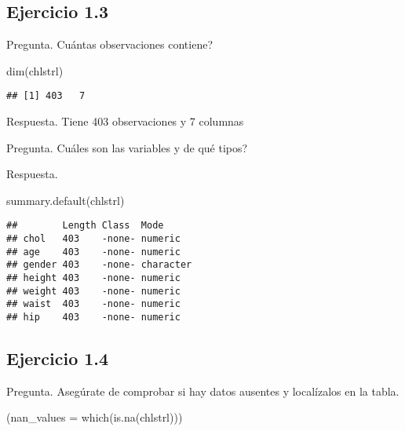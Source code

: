 \documentclass[
]{article}
\newenvironment{Shaded}{\begin{snugshade}}{\end{snugshade}}
\newcommand{\AttributeTok}[1]{\textcolor[rgb]{0.77,0.63,0.00}{#1}}
\newcommand{\FunctionTok}[1]{\textcolor[rgb]{0.00,0.00,0.00}{#1}}
\newcommand{\NormalTok}[1]{#1}
\begin{document}
\hypertarget{ejercicio-1.3}{%
\subsection{Ejercicio 1.3}\label{ejercicio-1.3}}

Pregunta. Cuántas observaciones contiene?

\begin{Shaded}
\begin{Highlighting}[]
\FunctionTok{dim}\NormalTok{(chlstrl)}
\end{Highlighting}
\end{Shaded}

\begin{verbatim}
## [1] 403   7
\end{verbatim}

Respuesta. Tiene 403 observaciones y 7 columnas

Pregunta. Cuáles son las variables y de qué tipos?

Respuesta.

\begin{Shaded}
\begin{Highlighting}[]
\FunctionTok{summary.default}\NormalTok{(chlstrl)}
\end{Highlighting}
\end{Shaded}

\begin{verbatim}
##        Length Class  Mode     
## chol   403    -none- numeric  
## age    403    -none- numeric  
## gender 403    -none- character
## height 403    -none- numeric  
## weight 403    -none- numeric  
## waist  403    -none- numeric  
## hip    403    -none- numeric
\end{verbatim}

\hypertarget{ejercicio-1.4}{%
\subsection{Ejercicio 1.4}\label{ejercicio-1.4}}

Pregunta. Asegúrate de comprobar si hay datos ausentes y localízalos en
la tabla.

\begin{Shaded}
\begin{Highlighting}[]
\NormalTok{(}\AttributeTok{nan\_values =} \FunctionTok{which}\NormalTok{(}\FunctionTok{is.na}\NormalTok{(chlstrl)))}
\end{Highlighting}
\end{Shaded}
\end{document}
